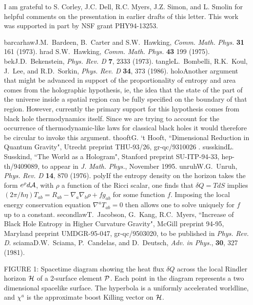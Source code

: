 \vskip 1cm
I am grateful to S. Corley, J.C. Dell, R.C. Myers, J.Z. Simon, and
L. Smolin for helpful comments on the presentation in earlier
drafts of this letter.
This work was supported in part by NSF grant PHY94-13253.


\begin{thebibliography}{999999}
%
\bibitem%
{barcarhaw}J.M.~Bardeen, B.~Carter and S.W.~Hawking,
{\it Comm. Math. Phys.} {\bf 31} 161 (1973).
%
\bibitem%
{hrad}
S.W.~Hawking, {\sl Comm. Math. Phys.} {\bf 43} 199 (1975).
%
\bibitem%
{bek}J.D.~Bekenstein, {\sl Phys. Rev. D} {\bf 7}, 2333 (1973).
%
\bibitem%
{tangle}L.~Bombelli, R.K.~Koul, J.~Lee, and R.D.~Sorkin,
{\sl Phys. Rev. D} {\bf 34}, 373 (1986).
%
\bibitem%
{holo}Another
argument that might be advanced in support of the
proportionality of entropy and area comes from the holographic
hypothesis\cite{thooft,susskind},
ie, the idea that the state of the part of the
universe inside a spatial region can be fully specified
on the boundary of that region. However, currently the
primary support for this hypothesis comes from black hole
thermodynamics itself. Since we are trying to account for the
occurrence of thermodynamic-like laws for classical black
holes it would therefore be circular to invoke this argument.
%
\bibitem%
{thooft}G. `t Hooft, ``Dimensional Reduction in Quantum Gravity",
Utrecht preprint THU-93/26, gr-qc/9310026 .
%
\bibitem%
{susskind}L. Susskind, ``The World as a Hologram",
Stanford preprint SU-ITP-94-33, hep-th/9409089, to appear in
{\sl J. Math. Phys.}, November 1995.
%
\bibitem%
{unruh}W.G.~Unruh, {\sl Phys. Rev. D} {\bf 14}, 870 (1976).
%
\bibitem%
{poly}If the entropy density on the horizon takes the form
$e^\rho d{\cal A}$,
with $\rho$ a function of the Ricci scalar,
one finds that $\delta Q=T dS$ implies
$(2\pi/\hbar\eta)T_{ab}= R_{ab} -\nabla_a\nabla_b\rho + f g_{ab}$
for some function $f$\cite{secondlaw}.
Imposing the local energy conservation equation
$\nabla^a T_{ab}=0$ then allows one to solve uniquely for $f$
up to a constant.
%
\bibitem%
{secondlaw}T.~Jacobson, G.~Kang, R.C.~Myers,
``Increase of Black Hole Entropy in Higher Curvature Gravity",
McGill preprint
94-95, Maryland preprint UMDGR-95-047, gr-qc/9503020, to be published
in {\sl Phys. Rev. D}.
%
\bibitem%
{sciama}D.W.~Sciama, P.~Candelas, and D.~Deutsch, {\sl Adv. in Phys.},
{\bf 30}, 327 (1981).

\end{thebibliography}

\vskip 1cm
\noindent FIGURE 1: Spacetime diagram showing the heat flux $\delta Q$
across the local Rindler horizon $\cal H$ of a 2-surface element
$\cal P$. Each point in the diagram represents a two dimensional
spacelike surface. The hyperbola is a uniformly accelerated worldline,
and $\chi^a$ is the approximate boost Killing vector on $\cal H$.





